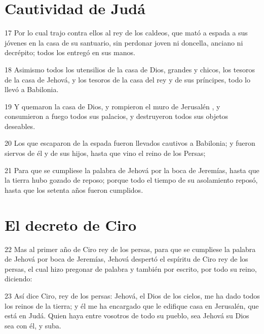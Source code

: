 \section*{Cautividad de Judá}


\par 17 Por lo cual trajo contra ellos al rey de los caldeos, que mató a espada a sus jóvenes en la casa de su santuario, sin perdonar joven ni doncella, anciano ni decrépito; todos los entregó en sus manos.
\par 18 Asimismo todos los utensilios de la casa de Dios, grandes y chicos, los tesoros de la casa de Jehová, y los tesoros de la casa del rey y de sus príncipes, todo lo llevó a Babilonia.
\par 19 Y quemaron la casa de Dios, y rompieron el muro de Jerusalén , y consumieron a fuego todos sus palacios, y destruyeron todos sus objetos deseables.
\par 20 Los que escaparon de la espada fueron llevados cautivos a Babilonia; y fueron siervos de él y de sus hijos, hasta que vino el reino de los Persas;
\par 21 Para que se cumpliese la palabra de Jehová por la boca de Jeremías, hasta que la tierra hubo gozado de reposo; porque todo el tiempo de su asolamiento reposó, hasta que los setenta años fueron cumplidos. 

\section*{El decreto de Ciro}

\par 22 Mas al primer año de Ciro rey de los persas, para que se cumpliese la palabra de Jehová por boca de Jeremías, Jehová despertó el espíritu de Ciro rey de los persas, el cual hizo  pregonar de palabra y también por escrito, por todo su reino,  diciendo:
\par 23 Así dice Ciro, rey de los persas: Jehová, el Dios de los cielos, me ha dado todos los reinos de la tierra; y él me ha encargado que le edifique casa en Jerusalén, que está en Judá. Quien haya entre vosotros de todo su pueblo, sea Jehová su Dios sea con él, y suba.

